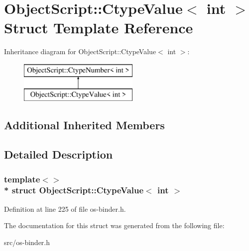 \hypertarget{struct_object_script_1_1_ctype_value_3_01int_01_4}{}\section{Object\+Script\+:\+:Ctype\+Value$<$ int $>$ Struct Template Reference}
\label{struct_object_script_1_1_ctype_value_3_01int_01_4}
Inheritance diagram for Object\+Script\+:\+:Ctype\+Value$<$ int $>$\+:\begin{figure}[H]
\begin{center}
\leavevmode
\includegraphics[height=2.000000cm]{struct_object_script_1_1_ctype_value_3_01int_01_4}
\end{center}
\end{figure}
\subsection*{Additional Inherited Members}


\subsection{Detailed Description}
\subsubsection*{template$<$$>$\\*
struct Object\+Script\+::\+Ctype\+Value$<$ int $>$}



Definition at line 225 of file os-\/binder.\+h.



The documentation for this struct was generated from the following file\+:\begin{DoxyCompactItemize}
\item 
src/os-\/binder.\+h\end{DoxyCompactItemize}
